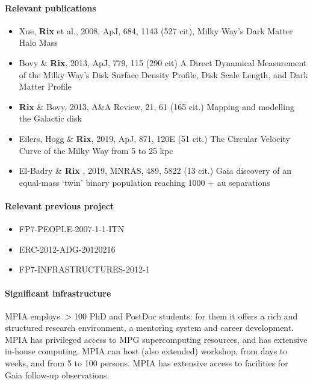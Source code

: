 \paragraph{Relevant publications}
\begin{itemize}
    \item Xue, \textbf{Rix} et al., 2008, ApJ, 684, 1143 (527 cit), Milky Way's Dark Matter Halo Mass
    \item Bovy \& \textbf{Rix}, 2013, ApJ, 779, 115 (290 cit) A Direct Dynamical Measurement of the Milky Way's Disk Surface Density Profile, Disk Scale Length, and Dark Matter Profile 
    \item \textbf{Rix} \& Bovy, 2013, A\&A Review, 21, 61 (165 cit.) Mapping and modelling the Galactic disk
    \item Eilers, Hogg \& \textbf{Rix}, 2019, ApJ, 871, 120E (51 cit.) The Circular Velocity Curve of the Milky Way from 5 to 25 kpc
    \item El-Badry \& \textbf{Rix} , 2019, MNRAS, 489, 5822 (13 cit.) Gaia discovery of an equal-mass `twin' binary population reaching 1000 + au separations
\end{itemize}

\paragraph{Relevant previous project}
\begin{itemize}
    \item FP7-PEOPLE-2007-1-1-ITN
    \item ERC-2012-ADG-20120216
    \item FP7-INFRASTRUCTURES-2012-1
\end{itemize}

\paragraph{Significant infrastructure}
MPIA employs $>$100 PhD and PostDoc students: for them it offers 
a rich and structured research environment, a mentoring system
and career development. MPIA has privileged access to MPG supercomputing resources,
and has extensive in-house computing. MPIA can host (also extended) workshop, from days to weeks, and from 5 to 100 persons. 
MPIA has extensive access to facilities for Gaia follow-up observations.
